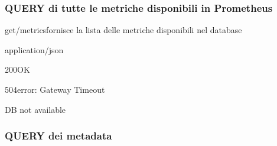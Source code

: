 \subsubsection{QUERY di tutte le metriche disponibili in Prometheus}
    \begin{apiRoute}{get}{/metrics}{fornisce la lista delle metriche disponibili nel database}
    	\begin{routeResponse}{application/json}
    		\begin{routeResponseItem}{200}{OK}
    			\begin{routeResponseItemBody}
        
    			\end{routeResponseItemBody}
    		\end{routeResponseItem}
    		\begin{routeResponseItem}{504}{error: Gateway Timeout}
    			\begin{routeResponseItemBody}
DB not available
    			\end{routeResponseItemBody}
    		\end{routeResponseItem}
    	\end{routeResponse}
    	
    \end{apiRoute}
\subsubsection{QUERY dei metadata}
    
